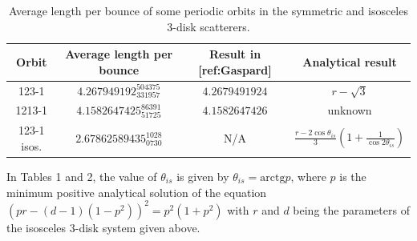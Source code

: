 \documentclass[pre, amsmath, amssymb, onecolumn, showpacs]{revtex4-1}
\begin{document}
\begin{table}[h!]
\centering
\begin{tabular}{||c c c c||} 
 \hline
 Orbit & Average length per bounce & Result in [ref:Gaspard] & Analytical result \\ [0.5ex] 
 \hline\hline
 123-1 & $4.267949192_{331957}^{504375}$ & $4.2679491924$ & $r - \sqrt{3}$ \\ [1ex] 
 1213-1 & $4.1582647425_{51725}^{86391}$ & $4.1582647426$ & unknown \\ [1ex] 
 123-1 isos. & $2.67862589435_{0730}^{1028}$ & N/A & $\frac{r - 2 \cos{\theta_{is}}}{3} (1 + \frac{1}{\cos{2 \theta_{is}}})$ \\ [1ex]
 \hline
\end{tabular}
\caption{Average length per bounce of some periodic orbits in the symmetric and isosceles 3-disk scatterers.}
\label{table:1}
\end{table}

In Tables 1 and 2, the value of $\theta_{is}$ is given by $\theta_{is} = \mathrm{arctg} p$, where $p$ is the minimum positive analytical solution of the equation $(p r - (d-1)(1-p^2))^2 = p^2 (1+p^2)$ with $r$ and $d$ being the parameters of the isosceles 3-disk system given above.

\vspace*{10pt}




\end{document}
